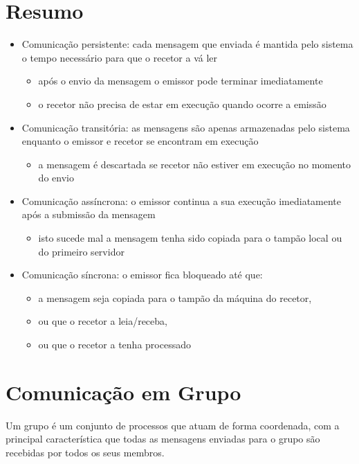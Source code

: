 \documentclass[10pt,a4paper]{report}
\begin{document}
\section{Resumo}
\begin{itemize}
\item Comunicação persistente: cada mensagem que enviada é mantida pelo sistema o tempo necessário para que o recetor a vá ler
\begin{itemize}
\item após o envio da mensagem o emissor pode terminar imediatamente
\item o recetor não precisa de estar em execução quando ocorre a emissão
\end{itemize}
\item Comunicação transitória: as mensagens são apenas armazenadas pelo sistema enquanto o emissor e recetor se encontram em execução
\begin{itemize}
\item a mensagem é descartada se recetor não estiver em execução no momento do envio
\end{itemize}
\end{itemize}
\begin{itemize}
\item Comunicação assíncrona: o emissor continua a sua execução imediatamente após a submissão da mensagem
\begin{itemize}
\item isto sucede mal a mensagem tenha sido copiada para o tampão local ou do primeiro servidor
\end{itemize}
\item Comunicação síncrona: o emissor fica bloqueado até que:
\begin{itemize}
\item a mensagem seja copiada para o tampão da máquina do recetor,
\item ou que o recetor a leia/receba,
\item ou que o recetor a tenha processado
\end{itemize}
\end{itemize}
\section{Comunicação em Grupo}
Um grupo é um conjunto de processos que atuam de forma coordenada, com a principal característica que todas as mensagens enviadas para o grupo são recebidas por todos os seus membros.
\end{document}
